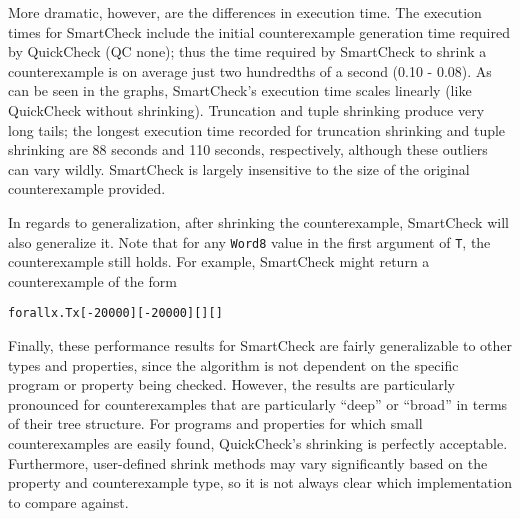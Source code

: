 \documentclass{sigplanconf}
\newenvironment{code}{\begin{alltt}\footnotesize}{\end{alltt}}
\newcommand{\ttp}[1]{\texttt{#1}}
\begin{document}
More dramatic, however, are the differences in execution time.  The execution
times for SmartCheck include the initial counterexample generation time required
by QuickCheck (QC none); thus the time required by SmartCheck to shrink a
counterexample is on average just two hundredths of a second (0.10 - 0.08).  As
can be seen in the graphs, SmartCheck's execution time scales linearly (like
QuickCheck without shrinking).  Truncation and tuple shrinking produce very long
tails; the longest execution time recorded for truncation shrinking and tuple
shrinking are 88 seconds and 110 seconds, respectively, although these outliers
can vary wildly.  SmartCheck is largely insensitive to the size of the original
counterexample provided.

In regards to generalization, after shrinking the counterexample, SmartCheck
will also generalize it.  Note that for any \ttp{Word8} value in the first
argument of \ttp{T}, the counterexample still holds.  For example, SmartCheck
might return a counterexample of the form
%
\begin{code}
forall x . T x [-20000] [-20000] [] []
\end{code}

Finally, these performance results for SmartCheck are fairly generalizable to
other types and properties, since the algorithm is not dependent on the specific
program or property being checked.  However, the results are particularly
pronounced for counterexamples that are particularly ``deep'' or ``broad'' in
terms of their tree structure.  For programs and properties for which small
counterexamples are easily found, QuickCheck's shrinking is perfectly
acceptable.  Furthermore, user-defined shrink methods may vary significantly
based on the property and counterexample type, so it is not always clear which
implementation to compare against.







\end{document}
